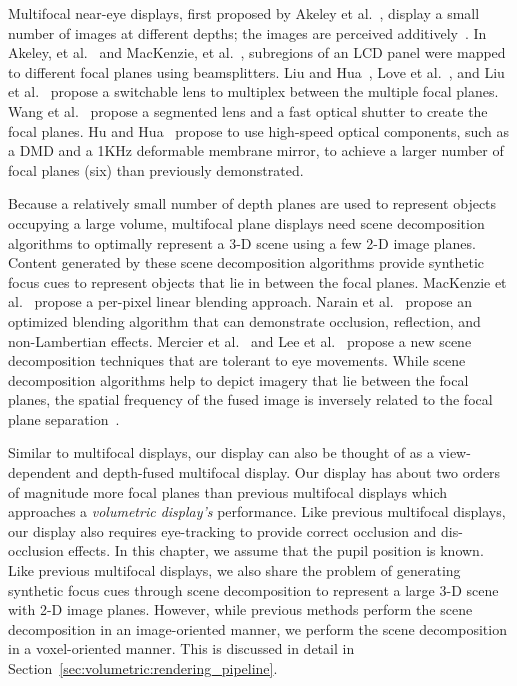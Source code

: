 Multifocal near-eye displays, first proposed by Akeley et al.~\cite{Akeley2004stereo}, display a small number of images at different depths; the images are perceived additively~\cite{Akeley2004stereo,MacKenzie2010Accommodation,Liu2010novel,Love2009high,Hu2015Design}. In Akeley, et al.~\cite{Akeley2004stereo} and MacKenzie, et al.~\cite{MacKenzie2010Accommodation}, subregions of an LCD panel were mapped to different focal planes using beamsplitters. Liu and Hua~\cite{liu2009time}, Love et al.~\cite{Love2009high}, and Liu et al.~\cite{Liu2010novel} propose a switchable lens to multiplex between the multiple focal planes. Wang et al.~\cite{wang2018digitally} propose a segmented lens and a fast optical shutter to create the focal planes.  Hu and Hua~\cite{Hu2014design,Hu2014High,Hu2015Design} propose to use high-speed optical components, such as a DMD and a 1KHz deformable membrane mirror, to achieve a larger number of focal planes (six) than previously demonstrated. 

Because a relatively small number of depth planes are used to represent objects occupying a large volume, multifocal plane displays need scene decomposition algorithms to optimally represent a 3-D scene using a few 2-D image planes. Content generated by these scene decomposition algorithms provide synthetic focus cues to represent objects that lie in between the focal planes. MacKenzie et al.~\cite{MacKenzie2010Accommodation} propose a per-pixel linear blending approach. Narain et al.~\cite{Narain2015optimal} propose an optimized blending algorithm that can demonstrate occlusion, reflection, and non-Lambertian effects. Mercier et al.~\cite{Mercier2017Fast} and Lee et al.~\cite{Lee2017foveated} propose a new scene decomposition techniques that are tolerant to eye movements. While scene decomposition algorithms help to depict imagery that lie between the focal planes, the spatial frequency of the fused image is inversely related to the focal plane separation~\cite{Hu2014design, Hua2017Enabling}. 

Similar to multifocal displays, our display can also be thought of as a view-dependent and depth-fused multifocal display. Our display has about two orders of magnitude more focal planes than previous multifocal displays which approaches a \emph{volumetric display's} performance. Like previous multifocal displays, our display also requires eye-tracking to provide correct occlusion and dis-occlusion effects. In this chapter, we assume that the pupil position is known. Like previous multifocal displays, we also share the problem of generating synthetic focus cues through scene decomposition to represent a large 3-D scene with 2-D image planes. However, while previous methods perform the scene decomposition in an image-oriented manner, we perform the scene decomposition in a voxel-oriented manner. This is discussed in detail in Section~\ref{sec:volumetric:rendering_pipeline}. 

